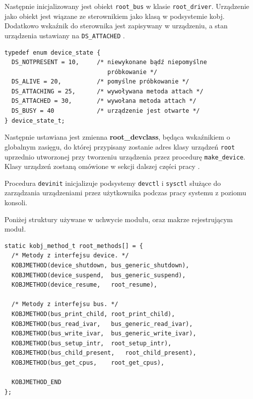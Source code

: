\documentclass[shortabstract,inz]{iithesis}
\begin{document}
Następnie inicjalizowany jest obiekt \texttt{root\_bus} w klasie \texttt{root\_driver}.
Urządzenie jako obiekt jest wiązane ze sterownikiem jako klasą w podsystemie kobj. 
Dodatkowo wskaźnik do sterownika jest zapisywany w urządzeniu, a stan 
urządzenia ustawiany na \texttt{DS\_ATTACHED} \cite{man:device_busy_9}.
\newpage
\begin{lstlisting}[caption=Typ opisujący stan urządzenia.]
typedef enum device_state {
  DS_NOTPRESENT = 10,     /* niewykonane bądź niepomyślne
                             próbkowanie */
  DS_ALIVE = 20,          /* pomyślne próbkowanie */
  DS_ATTACHING = 25,      /* wywoływana metoda attach */
  DS_ATTACHED = 30,       /* wywołana metoda attach */
  DS_BUSY = 40            /* urządzenie jest otwarte */
} device_state_t;
\end{lstlisting}


Następnie ustawiana jest zmienna \textbf{root\_devclass}, będąca wskaźnikiem o globalnym zasięgu,
do której przypisany zostanie adres klasy urządzeń \texttt{root} uprzednio utworzonej przy tworzeniu urządzenia
przez procedurę \texttt{make\_device}. 
Klasy urządzeń zostaną omówione w sekcji dalszej części pracy .

Procedura \texttt{devinit} inicjalizuje podsystemy \texttt{devctl} \cite{man:devctl_8}\cite{man:devctl_3} 
i \texttt{sysctl} \cite{man:sysctl_8}\cite{man:sysctl_3}
służące do zarządzania urządzeniami przez użytkownika podczas pracy systemu z poziomu konsoli.

Poniżej struktury używane w uchwycie modułu, oraz makrze rejestrującym moduł.

\begin{lstlisting}[caption=Tablica metod obiektu]
static kobj_method_t root_methods[] = {
  /* Metody z interfejsu device. */
  KOBJMETHOD(device_shutdown, bus_generic_shutdown),
  KOBJMETHOD(device_suspend,  bus_generic_suspend),
  KOBJMETHOD(device_resume,   root_resume),

  /* Metody z interfejsu bus. */
  KOBJMETHOD(bus_print_child, root_print_child),
  KOBJMETHOD(bus_read_ivar,   bus_generic_read_ivar),
  KOBJMETHOD(bus_write_ivar,  bus_generic_write_ivar),
  KOBJMETHOD(bus_setup_intr,  root_setup_intr),
  KOBJMETHOD(bus_child_present,   root_child_present),
  KOBJMETHOD(bus_get_cpus,    root_get_cpus),

  KOBJMETHOD_END
};
\end{lstlisting}
\end{document}
